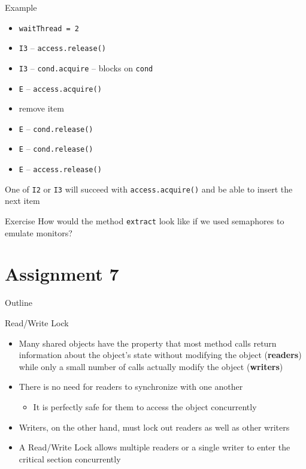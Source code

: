 \begin{frame}{Example}
  \begin{itemize}
  \item \lstinline!waitThread = 2!
  \item \lstinline!I3! -- \lstinline!access.release()!
  \item \lstinline!I3! -- \lstinline!cond.acquire! -- blocks on \lstinline!cond!
  \item \lstinline!E! -- \lstinline!access.acquire()!
  \item remove item
  \item \lstinline!E! -- \lstinline!cond.release()!
  \item \lstinline!E! -- \lstinline!cond.release()!
  \item \lstinline!E! -- \lstinline!access.release()!
  \end{itemize}


  One of \lstinline!I2! or \lstinline!I3! will succeed with
  \lstinline!access.acquire()! and be able to insert the next item
\end{frame}

\begin{frame}{Exercise}
  How would the method \lstinline!extract! look like if we used
  semaphores to emulate monitors?
\end{frame}


\section{Assignment 7}

\begin{frame}{Outline}
  \tableofcontents[current]
\end{frame}

\begin{frame}{Read/Write Lock}
  \begin{itemize}
  \item Many shared objects have the property that most method calls
    return information about the object's state without modifying the
    object ({\bf readers}) while only a small number of calls actually
    modify the object ({\bf writers})
  \item There is no need for readers to synchronize with one another
    \begin{itemize}
    \item It is perfectly safe for them to access the object
      concurrently
    \end{itemize}
  \item Writers, on the other hand, must lock out readers as well as
    other writers
  \item A Read/Write Lock allows multiple readers or a single
    writer to enter the critical section concurrently
  \end{itemize}
\end{frame}

